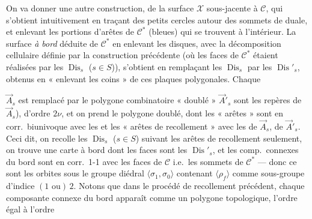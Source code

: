 \documentclass[11pt,a4paper]{article}
\begin{document}
On va donner une autre construction, de la surface $\mathcal{X}$ sous-jacente à $\mathcal{C}$, qui s'obtient intuitivement en traçant des petits cercles \struck{\ill{}} autour des sommets de    duale, et enlevant les portions d'arêtes de $\mathcal{C}^{*}$ (bleues) qui se trouvent à l'intérieur. La surface \emph{à bord} déduite de $\mathcal{C}^{*}$ en enlevant les disques, avec la décomposition cellulaire définie par la construction précédente (où les faces de $\mathcal{C}^{*}$ étaient réalisées par les $\operatorname{Dis}_s$ ($s \in S$)), s'obtient en remplaçant les $\operatorname{Dis}_s$ par les $\operatorname{Dis}'_s$, obtenus en « enlevant les coins » de ces plaques polygonales. Chaque

$\vec{A}_s$ est remplacé par le polygone combinatoire « doublé » $\vec{A}'_s$   sont les repères de $\vec{A}_s$),  d'ordre $2\nu$, et on prend le polygone doublé, dont les « arêtes »  sont en corr.\ biunivoque avec les   et les « arêtes de recollement » avec les  de $\vec{A}_s$,  \add{\ill{}} de $\vec{A}'_s$. Ceci dit, on recolle les $\operatorname{Dis}_s$ ($s \in S$) suivant les arêtes de recollement seulement, on trouve une carte à bord dont les faces sont les $\operatorname{Dis}'_s$, et les comp.\ connexes du bord sont en corr.\ 1-1 avec les \struck{\ill{}} faces de $\mathcal{C}$ i.e.\ les sommets de $\mathcal{C}^{*}$ --- donc ce sont les orbites sous le groupe diédral $\langle \sigma_1, \sigma_0 \rangle$ contenant $\langle \rho_f \rangle$ comme sous-groupe d'indice $(1 \text{ ou})\,2$. Notons que dans le procédé de recollement précédent, chaque composante connexe  du bord apparaît comme un polygone topologique, l'ordre égal à l'ordre
\end{document}
